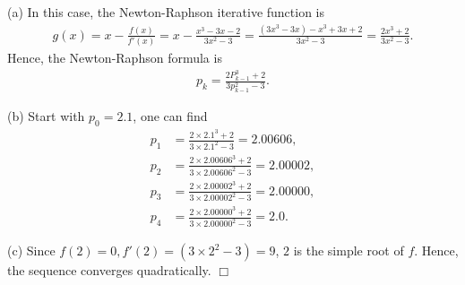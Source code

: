 \documentclass[UTF8,12pt,hyperref]{ctexart}
\newenvironment{solve}[1][\color{blue}\bf Solve]{\begin{trivlist}
\item[\hskip \labelsep {\color{blue}\bfseries
#1}]}{\hfill$\Box$\end{trivlist}}
\begin{document}
\begin{solve}
  (a) In this case, the Newton-Raphson iterative function is
   \begin{align*}
     g(x)= x - \frac{f(x)}{f'(x)} = x - \frac{x^3-3x-2}{3x^2-3} = \frac{(3x^3-3x)-x^3+3x+2}{3x^2-3}=\frac{2x^3+2}{3x^2-3}.
   \end{align*}
   Hence, the Newton-Raphson formula is
   \begin{align}
     \label{eq:Newton-Raphson formula 2}
     p_k=\frac{2P_{k-1}^3+2}{3p_{k-1}^2-3}.
   \end{align}
   \par
   (b) Start with $p_0=2.1$, one can find
   \begin{align*}
     p_1 &= \frac{2\times 2.1^3+2}{3\times 2.1^2-3}=2.00606,\\
     p_2 &= \frac{2\times 2.00606^3+2}{3\times 2.00606^2-3}= 2.00002,\\
     p_3 &= \frac{2\times 2.00002^3+2}{3\times 2.00002^2-3}= 2.00000,\\
     p_4 &= \frac{2\times 2.00000^3+2}{3\times 2.00000^2-3}= 2.0.
   \end{align*}
   \par
   (c) Since $f(2) = 0,f'(2)=(3\times 2^2-3)=9$, $2$ is the simple root of $f$.
   Hence, the sequence converges quadratically.
\end{solve}
\end{document}
